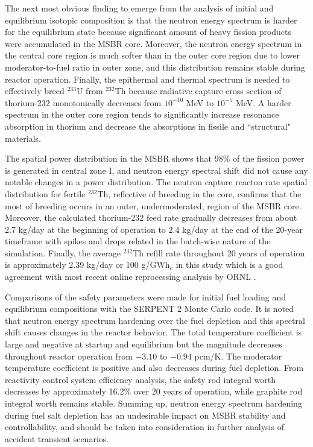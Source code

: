 The next most obvious finding to emerge from the analysis of initial and equilibrium isotopic composition is that the neutron energy spectrum is harder for the equilibrium state because significant amount of heavy fission products were accumulated in the \gls{MSBR} core. Moreover, the neutron energy spectrum in the central core region is much softer than in the outer core region due to lower moderator-to-fuel ratio in outer zone, and this distribution remains stable during reactor operation. Finally, the epithermal and thermal spectrum is needed to effectively breed $^{233}$U from $^{232}$Th because radiative capture cross section of thorium-232 monotonically decreases from $10^{-10}$ MeV to $10^{-5}$ MeV. A harder spectrum in the outer core region tends to significantly increase resonance absorption in thorium and decrease the absorptions in fissile and ``structural" materials. 

The spatial power distribution in the \gls{MSBR} shows that 98\% of the fission power is generated in central zone I, and neutron energy spectral shift did not cause any notable changes in a power distribution. The neutron capture reacton rate spatial distribution for fertile $^{232}$Th, reflective of breeding in the core, confirms that the most of breeding occurs in an outer, undermoderated, region of the \gls{MSBR} core. Moreover, the calculated thorium-232 feed rate gradually decreases from about 2.7 kg/day at the beginning of operation to 2.4 kg/day at the end of the 20-year timeframe with spikes and drops related in the batch-wise nature of the simulation. Finally, the average $^{232}$Th refill rate throughout 20 years of operation is approximately 2.39 kg/day or 100 g/GWh$_e$ in this study which is a good agreement with most recent online reprocessing analysis by \gls{ORNL} \cite{betzler_molten_2017}.

Comparisons of the safety parameters were made for initial fuel loading and equilibrium compositions with the SERPENT 2 Monte Carlo code. It is noted that neutron energy spectrum hardening over the fuel depletion and this spectral shift causes changes in the reactor behavior. The total temperature coefficient is large and negative at startup and equilibrium but the magnitude decreases throughout reactor operation from $-3.10$ to $-0.94$ pcm/K. The moderator temperature coefficient is positive and also decreases during fuel depletion. From reactivity control system efficiency analysis, the safety rod integral worth decreases by approximately 16.2\% over 20 years of operation, while graphite rod integral worth remains stable. Summing up, neutron energy spectrum hardening during fuel salt depletion has an undesirable impact on \gls{MSBR} stability and controllability, and should be taken into consideration in further analysis of accident transient scenarios.

